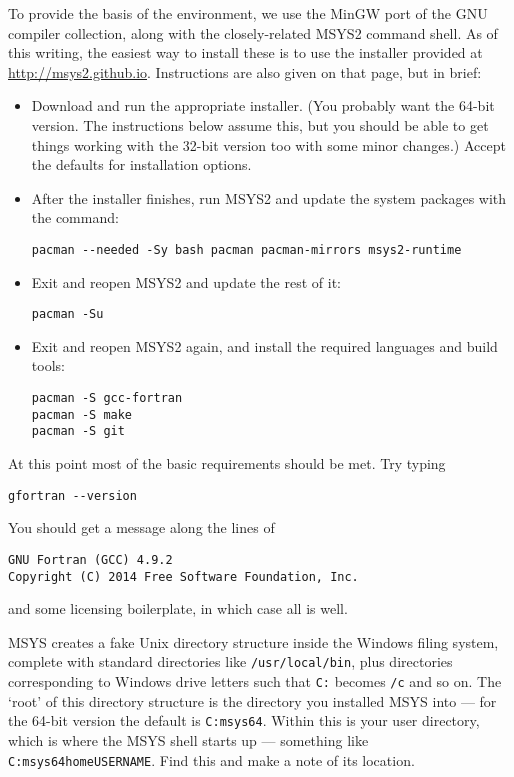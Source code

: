 \documentclass[a4paper,11pt]{article}
\begin{document}
To provide the basis of the environment, we use the MinGW port of the GNU compiler collection, along with the closely-related MSYS2 command shell. As of this writing, the easiest way to install these is to use the installer provided at \url{http://msys2.github.io}. Instructions are also given on that page, but in brief:
\begin{itemize}
\item Download and run the appropriate installer. (You probably want the 64-bit version. The instructions below assume this, but you should be able to get things working with the 32-bit version too with some minor changes.) Accept the defaults for installation options.
\item After the installer finishes, run MSYS2 and update the system packages with the command:
\begin{verbatim}pacman --needed -Sy bash pacman pacman-mirrors msys2-runtime\end{verbatim}
\item Exit and reopen MSYS2 and update the rest of it:
\begin{verbatim}pacman -Su\end{verbatim}
\item Exit and reopen MSYS2 again, and install the required languages and build tools:
\begin{verbatim}
pacman -S gcc-fortran
pacman -S make
pacman -S git
\end{verbatim}
\end{itemize}

At this point most of the basic requirements should be met. Try typing
\begin{verbatim}gfortran --version\end{verbatim}
You should get a message along the lines of
\begin{verbatim}
GNU Fortran (GCC) 4.9.2
Copyright (C) 2014 Free Software Foundation, Inc.
\end{verbatim}
and some licensing boilerplate, in which case all is well.

MSYS creates a fake Unix directory structure inside the Windows filing system, complete with standard directories like \texttt{/usr/local/bin}, plus directories corresponding to Windows drive letters such that \texttt{C:} becomes \texttt{/c} and so on. The `root' of this directory structure is the directory you installed MSYS into --- for the 64-bit version the default is \texttt{C:msys64}. Within this is your user directory, which is where the MSYS shell starts up --- something like \texttt{C:msys64homeUSERNAME}. Find this and make a note of its location.
\end{document}
